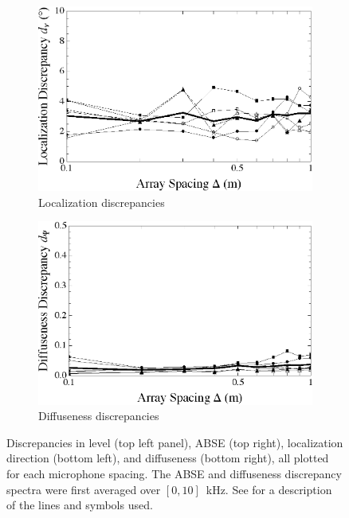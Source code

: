 \begin{figure}[t]
	\vspace{0.5cm}
	\begin{subfigure}[b]{0.49\textwidth}
		\includegraphics[width=\textwidth]{10_experimental_validation/figures/tylka2017_fullexp_D.eps}
		\caption{Localization discrepancies}
		\label{fig:10_Experimental_Validation:rPE_Delta_Discrepancy}
    	\end{subfigure}
	\hfill
	\begin{subfigure}[b]{0.49\textwidth}
		\includegraphics[width=\textwidth]{10_experimental_validation/figures/merimaa2005_fullexp_D.eps}
		\caption{Diffuseness discrepancies}
		\label{fig:10_Experimental_Validation:Diffuseness_Delta_Discrepancy}
    	\end{subfigure}
	
    	\caption[Experimental discrepancies for each microphone spacing.]{
	Discrepancies in level (top left panel), ABSE (top right), localization direction (bottom left), and diffuseness (bottom right), all plotted for each microphone spacing.
	The ABSE and diffuseness discrepancy spectra were first averaged over $[0,10]$~kHz.
  See  for a description of the lines and symbols used.}
    	\label{fig:10_Experimental_Validation:Delta_Discrepancies}
\end{figure}

